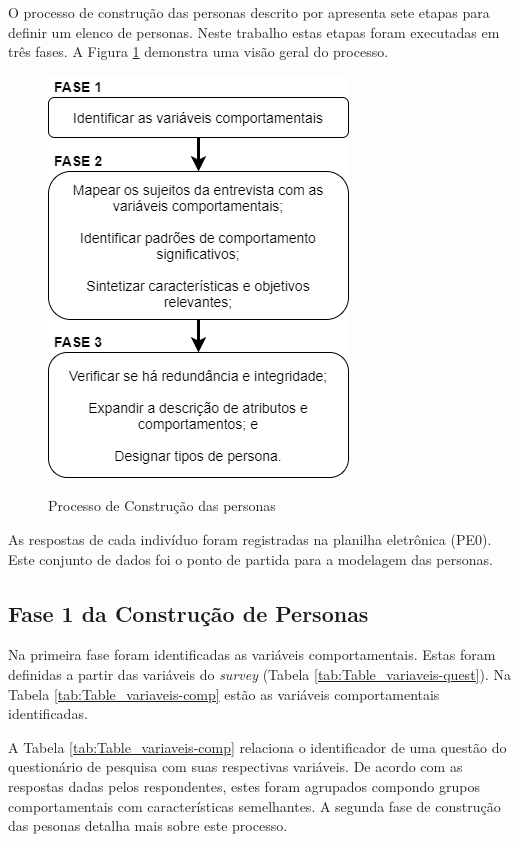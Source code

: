 O processo de construção das personas descrito por  apresenta sete etapas para definir um elenco de personas. Neste trabalho estas etapas foram executadas em três fases. A Figura \ref{Fig:construct_persona.png} demonstra uma visão geral do processo.
\newpage

\begin{figure}[htbp]
	\centering
	\caption{Processo de Construção das personas}
	\includegraphics[keepaspectratio=true,scale=0.6]{figuras/metodologia/construct_persona.png}
	\label{Fig:construct_persona.png}
\end{figure}


As respostas de cada indivíduo foram registradas na planilha eletrônica (PE0). Este conjunto de dados foi o ponto de partida para a modelagem das personas.

\subsection{Fase 1 da Construção de Personas}

Na primeira fase foram identificadas as variáveis comportamentais. Estas foram definidas a partir das variáveis do \textit{survey} (Tabela \ref{tab:Table_variaveis-quest}). Na Tabela \ref{tab:Table_variaveis-comp} estão as variáveis comportamentais identificadas. 



A Tabela \ref{tab:Table_variaveis-comp} relaciona o identificador de uma questão do questionário de pesquisa com suas respectivas variáveis. De acordo com as respostas dadas pelos respondentes, estes foram agrupados compondo grupos comportamentais com características semelhantes. A segunda fase de construção das pesonas detalha mais sobre este processo.  


